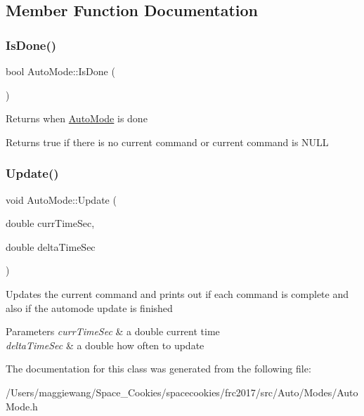 \subsection{Member Function Documentation}
\mbox{\label{class_auto_mode_a6f734a1af959e284fced7666e397bf65}} 
\subsubsection{\texorpdfstring{Is\+Done()}{IsDone()}}
{\footnotesize\ttfamily bool Auto\+Mode\+::\+Is\+Done (\begin{DoxyParamCaption}{ }\end{DoxyParamCaption})\hspace{0.3cm}{\ttfamily [inline]}}

Returns when \hyperlink{class_auto_mode}{Auto\+Mode} is done \begin{DoxyReturn}{Returns}
true if there is no current command or current command is N\+U\+LL 
\end{DoxyReturn}
\mbox{\label{class_auto_mode_af5eb2f835e2712588986ca8fd9a8735a}} 
\subsubsection{\texorpdfstring{Update()}{Update()}}
{\footnotesize\ttfamily void Auto\+Mode\+::\+Update (\begin{DoxyParamCaption}\item[{double}]{curr\+Time\+Sec,  }\item[{double}]{delta\+Time\+Sec }\end{DoxyParamCaption})\hspace{0.3cm}{\ttfamily [inline]}}

Updates the current command and prints out if each command is complete and also if the automode update is finished 
\begin{DoxyParams}{Parameters}
{\em curr\+Time\+Sec} & a double current time \\
\hline
{\em delta\+Time\+Sec} & a double how often to update \\
\hline
\end{DoxyParams}


The documentation for this class was generated from the following file\+:\begin{DoxyCompactItemize}
\item 
/\+Users/maggiewang/\+Space\+\_\+\+Cookies/spacecookies/frc2017/src/\+Auto/\+Modes/Auto\+Mode.\+h\end{DoxyCompactItemize}
